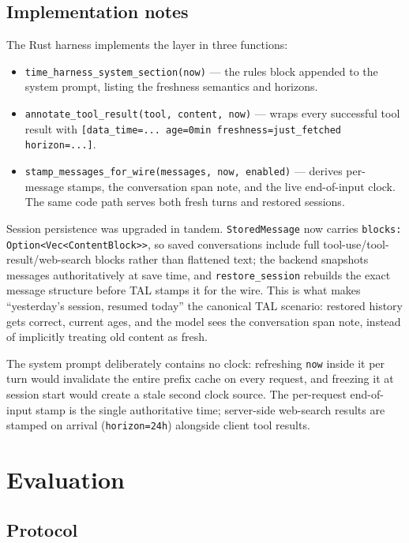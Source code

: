 \documentclass[10pt]{article}
\begin{document}
\subsection{Implementation notes}
\label{sec:impl}

The Rust harness implements the layer in three functions:
\begin{itemize}[leftmargin=1.4em,itemsep=1pt]
  \item \texttt{time\_harness\_system\_section(now)} --- the rules block appended to
        the system prompt, listing the freshness semantics and horizons.
  \item \texttt{annotate\_tool\_result(tool, content, now)} --- wraps every
        successful tool result with \verb![data_time=... age=0min freshness=just_fetched horizon=...]!.
  \item \texttt{stamp\_messages\_for\_wire(messages, now, enabled)} --- derives
        per-message stamps, the conversation span note, and the live end-of-input
        clock. The same code path serves both fresh turns and restored sessions.
\end{itemize}

Session persistence was upgraded in tandem. \texttt{StoredMessage} now carries
\texttt{blocks: Option<Vec<ContentBlock>>}, so saved conversations include full
tool-use/tool-result/web-search blocks rather than flattened text; the backend
snapshots messages authoritatively at save time, and \texttt{restore\_session}
rebuilds the exact message structure before TAL stamps it for the wire. This is what
makes ``yesterday's session, resumed today'' the canonical TAL scenario: restored
history gets correct, current ages, and the model sees the conversation span note,
instead of implicitly treating old content as fresh.

The system prompt deliberately contains no clock: refreshing \texttt{now} inside it
per turn would invalidate the entire prefix cache on every request, and freezing it
at session start would create a stale second clock source. The per-request
end-of-input stamp is the single authoritative time; server-side web-search results
are stamped on arrival (\texttt{horizon=24h}) alongside client tool results.

\section{Evaluation}
\label{sec:eval}

\subsection{Protocol}
\label{sec:protocol}
\end{document}
